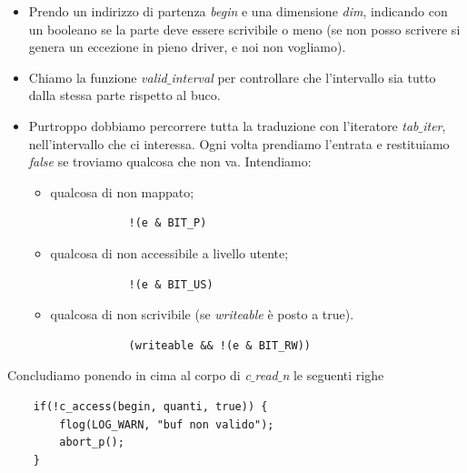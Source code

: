 \begin{itemize}
	\item Prendo un indirizzo di partenza \emph{begin} e una dimensione \emph{dim}, indicando con un booleano se la parte deve essere scrivibile o meno (se non posso scrivere si genera un eccezione in pieno driver, e noi non vogliamo).
	\item Chiamo la funzione \emph{valid$\_$interval} per controllare che l'intervallo sia tutto dalla stessa parte rispetto al buco. 
	\item Purtroppo dobbiamo percorrere tutta la traduzione con l'iteratore \emph{tab$\_$iter}, nell'intervallo che ci interessa. Ogni volta prendiamo l'entrata e restituiamo \emph{false} se troviamo qualcosa che non va. Intendiamo:
	\begin{itemize}
		\item qualcosa di non mappato;
		\begin{verbatim}
			!(e & BIT_P)
		\end{verbatim}
		\item qualcosa di non accessibile a livello utente;
		\begin{verbatim}
			!(e & BIT_US)
		\end{verbatim}
		\item qualcosa di non scrivibile (se \emph{writeable} è posto a true).
		\begin{verbatim}
			(writeable && !(e & BIT_RW))
		\end{verbatim}
	\end{itemize}
\end{itemize}
Concludiamo ponendo in cima al corpo di \emph{c$\_$read$\_$n} le seguenti righe
\begin{verbatim}
	if(!c_access(begin, quanti, true)) {
		flog(LOG_WARN, "buf non valido");
		abort_p();	
	}
\end{verbatim}

